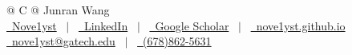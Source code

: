 \documentclass[a4paper,10pt]{article}
\begin{document}
\pagestyle{empty}



\begin{tabularx}{\linewidth}{@{} C @{}}
\Huge{Junran Wang} \\[7.5pt]
\href{https://github.com/Nove1yst}{\raisebox{-0.05\height}\faGithub\ Nove1yst} \ $|$ \
\href{https://www.linkedin.com/in/junran-wang-583a89359/}{\raisebox{-0.05\height}\faLinkedin\ LinkedIn} \ $|$ \
\href{https://scholar.google.com/citations?user=l_q7PVoAAAAJ}{\raisebox{-0.05\height}\faGraduationCap\ Google Scholar} \ $|$ \
\href{https://nove1yst.github.io}{\raisebox{-0.05\height}\faGlobe \ nove1yst.github.io} \\[2pt]
\href{mailto:nove1yst@gatech.edu}{\raisebox{-0.05\height}\faEnvelope \ nove1yst@gatech.edu} \ $|$ \
\href{tel:6788625631}{\raisebox{-0.05\height}\faMobile \ (678)862-5631} \\
\end{tabularx}



\end{document}

